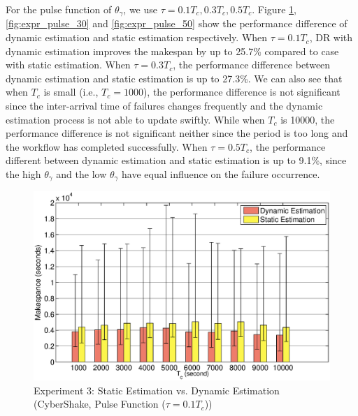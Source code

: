 For the pulse function of $\theta_{\gamma}$, we use $\tau=0.1T_c, 0.3T_c, 0.5T_c$. Figure \ref{fig:expr_pulse_10}, \ref{fig:expr_pulse_30} and \ref{fig:expr_pulse_50} show the performance difference of dynamic estimation and static estimation respectively. When $\tau=0.1T_c$, DR with dynamic estimation improves the makespan by up to 25.7\% compared to case with static estimation. When $\tau=0.3T_c$, the performance difference between dynamic estimation and static estimation is up to 27.3\%. We can also see that when $T_c$ is small (i.e., $T_c=1000$), the performance difference is not significant since the inter-arrival time of failures changes frequently and the dynamic estimation process is not able to update swiftly. While when $T_c$ is 10000, the performance difference is not significant neither since the period is too long and the workflow has completed successfully. When $\tau=0.5T_c$, the performance different between dynamic estimation and static estimation is up to 9.1\%, since the high $\theta_{\gamma}$ and the low $\theta_{\gamma}$ have equal influence on the failure occurrence. 


\begin{figure}[!htb]
\centering
  \includegraphics[width=1\linewidth]{figures/tolerance/pulse_t10.eps}
  \caption{Experiment 3: Static Estimation vs. Dynamic Estimation (CyberShake, Pulse Function ($\tau=0.1T_c$))}
  \label{fig:expr_pulse_10}
\end{figure}

